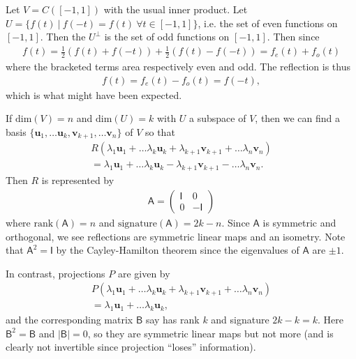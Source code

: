 \documentclass[letter-paper]{tufte-book}
\newenvironment{example}[1][Example]{\begin{trivlist}
\item[\hskip \labelsep {\bfseries #1}]}{\end{trivlist}}
\newcommand{\As}{{\mathsf{A}}}
\newcommand{\Bs}{{\mathsf{B}}}
\newcommand{\Is}{{\mathsf{I}}}
\newcommand{\ub}{{\boldsymbol{u}}}
\newcommand{\vb}{{\boldsymbol{v}}}
\begin{document}
\begin{example}
  Let $V = C([-1,1])$ with the usual inner product. Let $U = \{ f(t)\ |\ f(-t) = f(t)\ \forall t\in[-1, 1]\}$, i.e. the set of even functions on $[-1, 1]$. Then the $U^\perp$ is the set of odd functions on $[-1, 1]$. Then since
  \begin{align*}
    f(t) = \frac{1}{2}(f(t) + f(-t)) + \frac{1}{2}(f(t) - f(-t)) = f_e(t) + f_o(t)
  \end{align*}
  where the bracketed terms area respectively even and odd. The reflection is thus
  \begin{align*}
    f(t) = f_e(t) - f_o(t) = f(-t),
  \end{align*}
  which is what might have been expected.
\end{example}

If $\mbox{dim}(V)=n$ and $\mbox{dim}(U)=k$ with $U$ a subspace of $V$, then we can find a basis $\{\ub_1, \ldots \ub_k, \vb_{k+1}, \ldots \vb_n\}$ of $V$ so that
\begin{align*}
  R(\lambda_1 \ub_1 + \ldots \lambda_k \ub_k + \lambda_{k+1}\vb_{k+1} + \ldots \lambda_n \vb_n) \\
  = \lambda_1 \ub_1 + \ldots \lambda_k \ub_k - \lambda_{k+1}\vb_{k+1} - \ldots \lambda_n \vb_n.
\end{align*}
Then $R$ is represented by
\begin{align*}
  \As = \begin{pmatrix} \Is & 0 \\ 0 & -\Is \end{pmatrix}
\end{align*}
where $\mbox{rank}(\As) = n$ and $\mbox{signature}(\As) = 2k - n$. Since $\As$ is symmetric and orthogonal, we see reflections are symmetric linear maps and an isometry. Note that $\As^2 = \Is$ by the Cayley-Hamilton theorem since the eigenvalues of $\As$ are $\pm 1$.

In contrast, projections $P$ are given by
\begin{align*}
  P(\lambda_1 \ub_1 + \ldots \lambda_k \ub_k + \lambda_{k+1}\vb_{k+1} + \ldots \lambda_n \vb_n) \\
  = \lambda_1 \ub_1 + \ldots \lambda_k \ub_k,
\end{align*}
and the corresponding matrix $\Bs$ say has rank $k$ and signature $2k - k = k$. Here $\Bs^2 = \Bs$ and $|\Bs| = 0$, so they are symmetric linear maps but not more (and is clearly not invertible since projection ``loses'' information).

\end{document}
